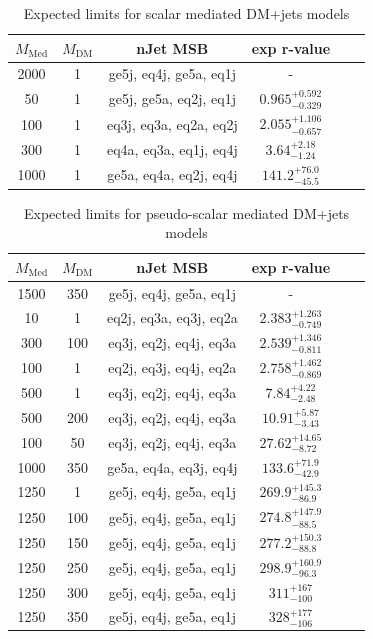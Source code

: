 \begin{table}
  \centering
  \begin{tabular}{cccccc}
    \hline\hline
    $M_{\text{Med}}$ & $M_{\text{DM}}$ & nJet MSB & exp r-value\\
    \hline
    2000 & 1 & ge5j, eq4j, ge5a, eq1j & - \\
    50 & 1 & ge5j, ge5a, eq2j, eq1j & $0.965_{-0.329}^{+0.592}$ \\
    100 & 1 & eq3j, eq3a, eq2a, eq2j & $2.055_{-0.657}^{+1.106}$ \\
    300 & 1 & eq4a, eq3a, eq1j, eq4j & $3.64_{-1.24}^{+2.18}$ \\
    1000 & 1 & ge5a, eq4a, eq2j, eq4j & $141.2_{-45.5}^{+76.0}$ \\
    \hline\hline
  \end{tabular}
  \caption{Expected limits for scalar mediated DM+jets models}
  \label{tab:DMS_exp}
\end{table}


\begin{table}
  \centering
  \begin{tabular}{cccccc}
    \hline\hline
    $M_{\text{Med}}$ & $M_{\text{DM}}$ & nJet MSB & exp r-value\\
    \hline
    1500 & 350 & ge5j, eq4j, ge5a, eq1j & - \\
    10 & 1 & eq2j, eq3a, eq3j, eq2a & $2.383_{-0.749}^{+1.263}$ \\
    300 & 100 & eq3j, eq2j, eq4j, eq3a & $2.539_{-0.811}^{+1.346}$ \\
    100 & 1 & eq2j, eq3j, eq4j, eq2a & $2.758_{-0.869}^{+1.462}$ \\
    500 & 1 & eq3j, eq2j, eq4j, eq3a & $7.84_{-2.48}^{+4.22}$ \\
    500 & 200 & eq3j, eq2j, eq4j, eq3a & $10.91_{-3.43}^{+5.87}$ \\
    100 & 50 & eq3j, eq2j, eq4j, eq3a & $27.62_{-8.72}^{+14.65}$ \\
    1000 & 350 & ge5a, eq4a, eq3j, eq4j & $133.6_{-42.9}^{+71.9}$ \\
    1250 & 1 & ge5j, eq4j, ge5a, eq1j & $269.9_{-86.9}^{+145.3}$ \\
    1250 & 100 & ge5j, eq4j, ge5a, eq1j & $274.8_{-88.5}^{+147.9}$ \\
    1250 & 150 & ge5j, eq4j, ge5a, eq1j & $277.2_{-88.8}^{+150.3}$ \\
    1250 & 250 & ge5j, eq4j, ge5a, eq1j & $298.9_{-96.3}^{+160.9}$ \\
    1250 & 300 & ge5j, eq4j, ge5a, eq1j & $311_{-100}^{+167}$ \\
    1250 & 350 & ge5j, eq4j, ge5a, eq1j & $328_{-106}^{+177}$ \\
\hline\hline
  \end{tabular}
  \caption{Expected limits for pseudo-scalar mediated DM+jets models}
  \label{tab:DMPS_exp}
\end{table}


